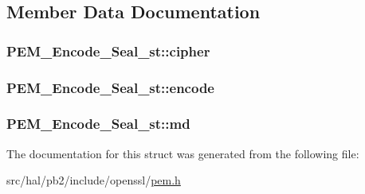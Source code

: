 \subsection{Member Data Documentation}
\subsubsection[{\texorpdfstring{cipher}{cipher}}]{ P\+E\+M\+\_\+\+Encode\+\_\+\+Seal\+\_\+st\+::cipher}\hypertarget{struct_p_e_m___encode___seal__st_a5a3c09ebd5be8036df38f8f623f5ef79}{}\label{struct_p_e_m___encode___seal__st_a5a3c09ebd5be8036df38f8f623f5ef79}
\subsubsection[{\texorpdfstring{encode}{encode}}]{ P\+E\+M\+\_\+\+Encode\+\_\+\+Seal\+\_\+st\+::encode}\hypertarget{struct_p_e_m___encode___seal__st_a47cfc43decced4ead8d4939f37ff5d32}{}\label{struct_p_e_m___encode___seal__st_a47cfc43decced4ead8d4939f37ff5d32}
\subsubsection[{\texorpdfstring{md}{md}}]{ P\+E\+M\+\_\+\+Encode\+\_\+\+Seal\+\_\+st\+::md}\hypertarget{struct_p_e_m___encode___seal__st_abdc58bdc153bb43dcf29e7a6a339f8bd}{}\label{struct_p_e_m___encode___seal__st_abdc58bdc153bb43dcf29e7a6a339f8bd}


The documentation for this struct was generated from the following file\+:\begin{DoxyCompactItemize}
\item 
src/hal/pb2/include/openssl/\hyperlink{pem_8h}{pem.\+h}\end{DoxyCompactItemize}

